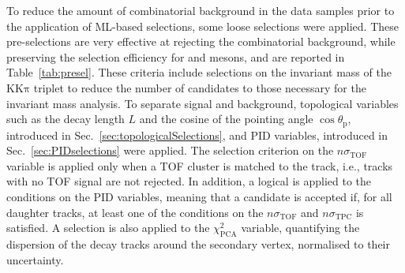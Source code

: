 To reduce the amount of combinatorial background in the data samples prior to the application of ML-based selections, some loose selections were applied. These pre-selections are very effective at rejecting the combinatorial background, while preserving the selection efficiency for \ds and \dpl mesons, and are reported in Table~\ref{tab:presel}. These criteria include selections on the invariant mass of the $\mathrm{KK\pi}$ triplet to reduce the number of candidates to those necessary for the invariant mass analysis. To separate signal and background, topological variables such as the decay length $L$ and the cosine of the pointing angle $\cos\theta_\mathrm{p}$, introduced in Sec.~\ref{sec:topologicalSelections}, and PID variables, introduced in Sec.~\ref{sec:PIDselections} were applied. The selection criterion on the $n\sigma_\mathrm{TOF}$ variable is applied only when a TOF cluster is matched to the track, i.e., tracks with no TOF signal are not rejected. In addition, a logical  is applied to the conditions on the PID variables, meaning that a candidate is accepted if, for all daughter tracks, at least one of the conditions on the $n\sigma_\mathrm{TOF}$ and $n\sigma_\mathrm{TPC}$ is satisfied. A selection is also applied to the $\chi^2_\mathrm{PCA}$ variable, quantifying the dispersion of the decay tracks around the secondary vertex, normalised to their uncertainty.

